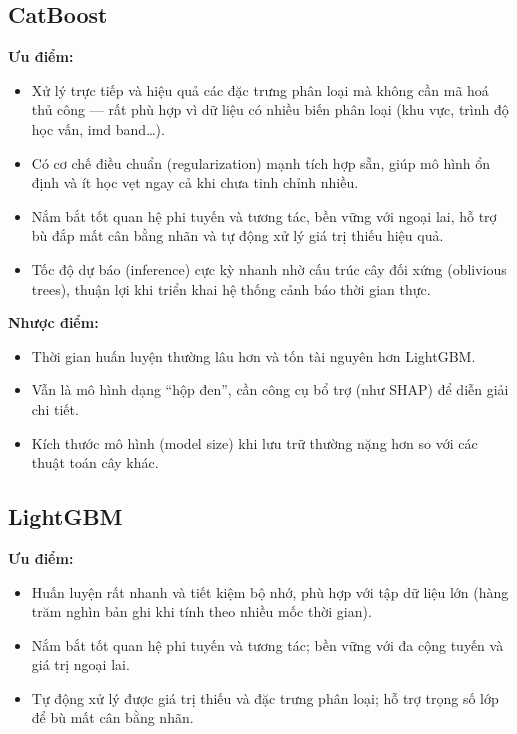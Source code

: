 \documentclass[a4paper]{article}
\newcommand{\code}[1]{{\ttfamily\def\_{\textunderscore\discretionary{}{}{}}#1}}
\def\code#1{#1}%
\def\_{ }%
\begin{document}
\subsection{CatBoost}

\textbf{Ưu điểm:}
\begin{itemize}[leftmargin=*]
  \item Xử lý trực tiếp và hiệu quả các đặc trưng phân loại mà không cần mã hoá
        thủ công --- rất phù hợp vì dữ liệu có nhiều biến phân loại (khu vực,
        trình độ học vấn, \code{imd\_band}\ldots).
  \item Có cơ chế điều chuẩn (regularization) mạnh tích hợp sẵn, giúp mô hình ổn
        định và ít học vẹt ngay cả khi chưa tinh chỉnh nhiều.
  \item Nắm bắt tốt quan hệ phi tuyến và tương tác, bền vững với ngoại lai, hỗ
        trợ bù đắp mất cân bằng nhãn và tự động xử lý giá trị thiếu hiệu quả.
  \item Tốc độ dự báo (inference) cực kỳ nhanh nhờ cấu trúc cây đối xứng (oblivious
        trees), thuận lợi khi triển khai hệ thống cảnh báo thời gian thực.
\end{itemize}

\textbf{Nhược điểm:}
\begin{itemize}[leftmargin=*]
  \item Thời gian huấn luyện thường lâu hơn và tốn tài nguyên hơn LightGBM.
  \item Vẫn là mô hình dạng ``hộp đen'', cần công cụ bổ trợ (như SHAP) để diễn
        giải chi tiết.
  \item Kích thước mô hình (model size) khi lưu trữ thường nặng hơn so với các
        thuật toán cây khác.
\end{itemize}

\subsection{LightGBM}

\textbf{Ưu điểm:}
\begin{itemize}[leftmargin=*]
  \item Huấn luyện rất nhanh và tiết kiệm bộ nhớ, phù hợp với tập dữ liệu lớn
        (hàng trăm nghìn bản ghi khi tính theo nhiều mốc thời gian).
  \item Nắm bắt tốt quan hệ phi tuyến và tương tác; bền vững với đa cộng tuyến
        và giá trị ngoại lai.
  \item Tự động xử lý được giá trị thiếu và đặc trưng phân loại; hỗ trợ trọng số
        lớp để bù mất cân bằng nhãn.
\end{itemize}
\end{document}
